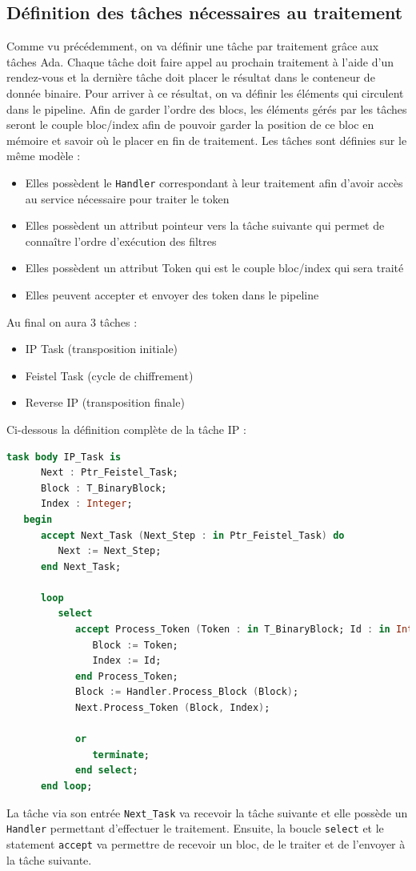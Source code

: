\documentclass[a4paper]{article}
\begin{document}
\subsection{Définition des tâches nécessaires au traitement}
Comme vu précédemment, on va définir une tâche par traitement grâce aux tâches Ada. Chaque tâche doit faire appel au prochain traitement à l'aide d'un rendez-vous et la dernière tâche doit placer le résultat dans le conteneur de donnée binaire.
\smallbreak
Pour arriver à ce résultat, on va définir les éléments qui circulent dans le pipeline. Afin de garder l'ordre des blocs, les éléments gérés par les tâches seront le couple bloc/index afin de pouvoir garder la position de ce bloc en mémoire et savoir où le placer en fin de traitement.
\smallbreak
Les tâches sont définies sur le même modèle : 
\begin{itemize}
\item Elles possèdent le \texttt{Handler} correspondant à leur traitement afin d'avoir accès au service nécessaire pour traiter le token
\item Elles possèdent un attribut pointeur vers la tâche suivante qui permet de connaître l'ordre d'exécution des filtres
\item Elles possèdent un attribut Token qui est le couple bloc/index qui sera traité
\item Elles peuvent accepter et envoyer des token dans le pipeline
\end{itemize}

Au final on aura 3 tâches :
\begin{itemize}
\item IP Task (transposition initiale)
\item Feistel Task (cycle de chiffrement)
\item Reverse IP (transposition finale)
\end{itemize}
Ci-dessous la définition complète de la tâche IP :
\newpage
	\begin{lstlisting}[language=ada]
   task body IP_Task is
      Next : Ptr_Feistel_Task;
      Block : T_BinaryBlock;
      Index : Integer;
   begin
      accept Next_Task (Next_Step : in Ptr_Feistel_Task) do
         Next := Next_Step;
      end Next_Task;
      
      loop
         select 
            accept Process_Token (Token : in T_BinaryBlock; Id : in Integer) do
               Block := Token;
               Index := Id;
            end Process_Token;
            Block := Handler.Process_Block (Block);
            Next.Process_Token (Block, Index);
            
            or
               terminate;
            end select;
      end loop;
	\end{lstlisting}
La tâche via son entrée \texttt{Next\_Task} va recevoir la tâche suivante et elle possède un \texttt{Handler} permettant d'effectuer le traitement. Ensuite, la boucle \texttt{select} et le statement \texttt{accept} va permettre de recevoir un bloc, de le traiter et de l'envoyer à la tâche suivante.
\end{document}

